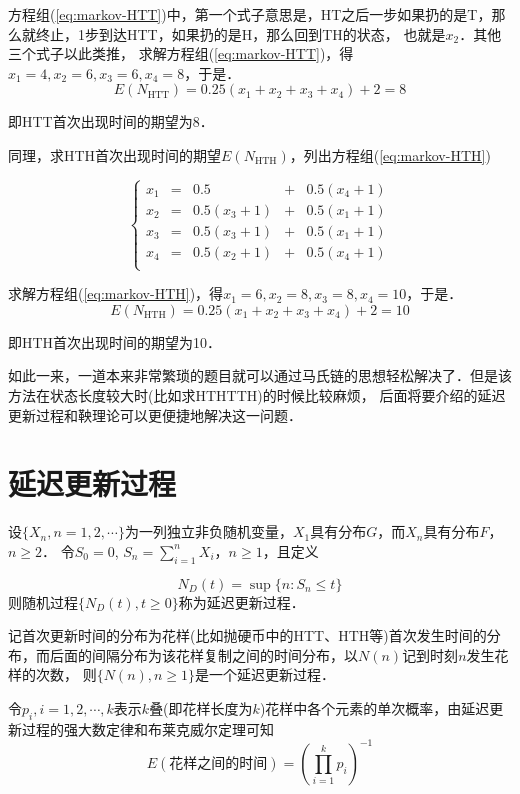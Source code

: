 \documentclass{article}
\begin{document}
方程组(\ref{eq:markov-HTT})中，第一个式子意思是，HT之后一步如果扔的是T，那么就终止，1步到达HTT，如果扔的是H，那么回到TH的状态，
也就是$x_2$．其他三个式子以此类推，
求解方程组(\ref{eq:markov-HTT})，得$x_1=4, x_2=6, x_3=6, x_4=8$，于是．
$$E(N_\text{HTT})=0.25(x_1+x_2+x_3+x_4)+2=8$$

即HTT首次出现时间的期望为8．

同理，求HTH首次出现时间的期望$E(N_\text{HTH})$，列出方程组(\ref{eq:markov-HTH})


\begin{equation}\label{eq:markov-HTH}
\left\{
\begin{array}{rrrrrr}
x_1&=&0.5&+&0.5(x_4+1)\\
x_2&=&0.5(x_3+1)&+&0.5(x_1+1)\\
x_3&=&0.5(x_3+1)&+&0.5(x_1+1)\\
x_4&=&0.5(x_2+1)&+&0.5(x_4+1)\\
\end{array}\right.
\end{equation}

求解方程组(\ref{eq:markov-HTH})，得$x_1=6, x_2=8, x_3=8, x_4=10$，于是．
$$E(N_\text{HTH})=0.25(x_1+x_2+x_3+x_4)+2=10$$

即HTH首次出现时间的期望为10．

如此一来，一道本来非常繁琐的题目就可以通过马氏链的思想轻松解决了．但是该方法在状态长度较大时(比如求HTHTTH)的时候比较麻烦，
后面将要介绍的延迟更新过程和鞅理论可以更便捷地解决这一问题．
\section{延迟更新过程}
设$\{X_n, n=1,2,\cdots\}$为一列独立非负随机变量，$X_1$具有分布$G$，而$X_n$具有分布$F$，$n \geqslant 2$． 令$S_0=0$, $S_n=\sum\limits_{i=1}^n X_i$，$n  \geqslant 1$，且定义

\begin{equation}\label{eq:renew}
N_D(t)=\sup\{n:S_n \leqslant t\}
\end{equation}
则随机过程$\{N_D(t), t\geqslant0\}$称为延迟更新过程\cite{1}．

记首次更新时间的分布为花样(比如抛硬币中的HTT、HTH等)首次发生时间的分布，而后面的间隔分布为该花样复制之间的时间分布，以$N(n)$记到时刻$n$发生花样的次数，
则$\{N(n), n \geqslant 1\}$是一个延迟更新过程．

令$p_i, i= 1,2,\cdots,k$表示$k$叠(即花样长度为$k$)花样中各个元素的单次概率，由延迟更新过程的强大数定律和布莱克威尔定理可知
\begin{equation}\label{eq:timeE}
E(\text{花样之间的时间})=(\prod_{i=1}^k p_i)^{-1}
\end{equation}
\end{document}

